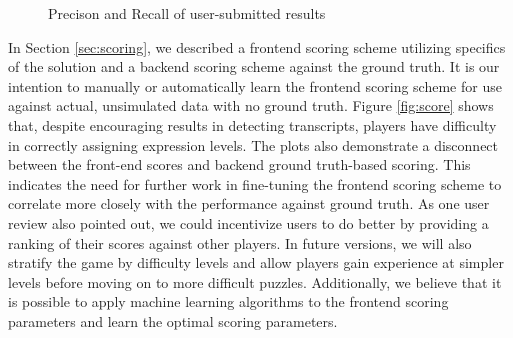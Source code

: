 \documentclass[12pt]{article}
\begin{document}
\begin{figure}[H]
\centering
{} 
\caption{Precison and Recall of user-submitted results}\label{fig:precisionandrecall}
\end{figure}

In Section \ref{sec:scoring}, we described a frontend scoring scheme utilizing specifics of the solution and a backend scoring scheme against the ground truth. It is our intention to manually or automatically learn the frontend scoring scheme for use against actual, unsimulated data with no ground truth. Figure \ref{fig:score} shows that, despite encouraging results in detecting transcripts, players have difficulty in correctly assigning expression levels. The plots also demonstrate a disconnect between the front-end scores and backend ground truth-based scoring. This indicates the need for further work in fine-tuning the frontend scoring scheme to correlate more closely with the performance against ground truth. As one user review also pointed out, we could incentivize users to do better by providing a ranking of their scores against other players. In future versions, we will also stratify the game by difficulty levels and allow players gain experience at simpler levels before moving on to more difficult puzzles. Additionally, we believe that it is possible to apply machine learning algorithms to the frontend scoring parameters and learn the optimal scoring parameters.
\end{document}
